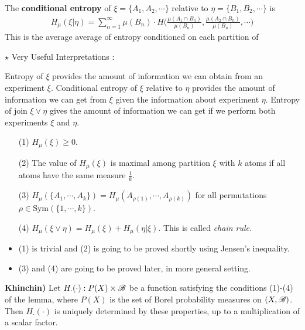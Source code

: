 \documentclass[12pt,a4paper]{report}
\newenvironment{proof}
{\begin{changemargin}{1cm}{0.5cm} 
	}%
	{\end{changemargin}
}
\begin{document}
\quad The \textbf{conditional entropy} of $\xi = \{A_1, A_2, \cdots \}$ relative to $\eta = \{B_1, B_2, \cdots \}$ is 
\begin{align*}
H_{\mu} (\xi | \eta) = \sum_{n=1}^{\infty} \mu(B_n) \cdot H\Big( \frac{\mu(A_1 \cap B_n)}{\mu(B_n)},\frac{\mu(A_2 \cap B_n)}{\mu(B_n)},\cdots \Big)
\end{align*}
This is the average average of entropy conditioned on each partition of 
\s

$\star$ Very Useful Interpretations : 

\quad Entropy of $\xi$ provides the amount of information we can obtain from an experiment $\xi$. Conditional entropy of $\xi$ relative to $\eta$ provides the amount of information we can get from $\xi$ given the information about experiment $\eta$. Entropy of join $\xi \vee \eta$ gives the amount of information we can get if we perform both experiments $\xi$ and $\eta$.
\s

\lem
\begin{itemize}
\item[(1)] $H_{\mu} (\xi) \geq 0$.
\item[(2)] The value of $H_{\mu}(\xi)$ is maximal among partition $\xi$ with $k$ atoms if all atoms have the same measure $\frac{1}{k}$.
\item[(3)] $H_{\mu}(\{A_1, \cdots, A_k \}) = H_{\mu}(A_{\rho (1)}, \cdots, A_{\rho (k)})$ for all permutations $\rho \in \text{Sym}(\{1,\cdots,k\})$.
\item[(4)] $H_{\mu} (\xi \vee \eta) = H_{\mu}(\xi) + H_{\mu}(\eta |\xi)$. This is called \emph{chain rule.}
\end{itemize}
\begin{proof}
\pf \begin{itemize}
\item (1) is trivial and (2) is going to be proved shortly using Jensen's inequality.
\item (3) and (4) are going to be proved later, in more general setting.
\end{itemize}
\end{proof}
\s

\textbf{Khinchin)} Let $H_{\cdot}(\cdot) : P(X) \times \mathscr{B}$ be a function satisfying the conditions (1)-(4) of the lemma, where $P(X)$ is the set of Borel probability measures on $(X,\mathscr{B})$. Then $H_{\cdot}(\cdot)$ is uniquely determined by these properties, up to a multiplication of a scalar factor.
\s

\newday
\s
\end{document}
